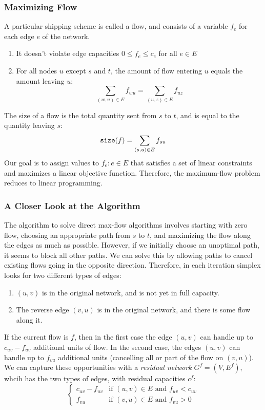 \subsubsection{Maximizing Flow}
A particular shipping scheme is called a flow, and consists of a variable $f_e$ for each edge $e$ of the network.
\begin{enumerate}
  \item It doesn't violate edge capacities $0 \leq f_e \leq c_e$ for all $e \in E$
  \item For all nodes $u$ except $s$ and $t$, the amount of flow entering $u$ equals the amount leaving $u$: $$\sum_{(w, u) \in E} f_{wu} = \sum_{(u, z) \in E} f_{uz}$$
\end{enumerate}
The size of a flow is the total quantity sent from $s$ to $t$, and is equal to the quantity leaving $s$: $$\verb|size|(f) = \sum_{(s, u) \in E} f_{su}$$
Our goal is to assign values to ${f_e : e \in E}$ that satisfies a set of linear constraints and maximizes a linear objective function.
Therefore, the maximum-flow problem reduces to linear programming.\\

\subsubsection{A Closer Look at the Algorithm}
The algorithm to solve direct max-flow algorithms involves starting with zero flow, choosing an appropriate path from $s$ to $t$, and maximizing the flow along the edges as much as possible.
However, if we initially choose an unoptimal path, it seems to block all other paths.
We can solve this by allowing paths to cancel existing flows going in the opposite direction.
Therefore, in each iteration simplex looks for two different types of edges:
\begin{enumerate}
  \item $(u, v)$ is in the original network, and is not yet in full capacity.
  \item The reverse edge $(v, u)$ is in the original network, and there is some flow along it.
\end{enumerate}
If the current flow is $f$, then in the first case the edge $(u, v)$ can handle up to $c_{uv} - f_{uv}$ additional units of flow.
In the second case, the edges $(u, v)$ can handle up to $f_{vu}$ additional units (cancelling all or part of the flow on $(v, u)$).
We can capture these opportunities with a \textit{residual network} $G^f = (V, E^f)$, whcih has the two types of edges, with residual capacities $c^f$:
$$\begin{cases}
  c_{uv} - f_{uv} & \text{if $(u, v) \in E$ and $f_{uv} < c_{uv}$}\\
  f_{vu} & \text{if $(v, u) \in E$ and $f_{vu} > 0$}
\end{cases}$$

